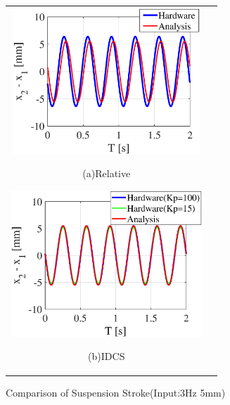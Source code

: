 \documentclass[a4paper,12pt]{article_vdlab_sotsuron}
\begin{document}
\begin{figure}[h]
  \begin{tabular}{cc}
  \begin{minipage}{0.5\hsize}
  \begin{center}
    \includegraphics[height=55mm]{figure/sim_rela_5_3.eps}
    \end{center}
    \begin{center}
    \ (a)Relative\
    \end{center}
  \end{minipage}
  \begin{minipage}{0.5\hsize}
     \begin{center}
      \includegraphics[height=55mm]{figure/sim_linear_5_3.eps}
      \end{center}
      \begin{center}
      \ (b)IDCS\
    \end{center}
  \end{minipage}
  \end{tabular}
  \vspace*{2mm}
  \caption{Comparison of Suspension Stroke(Input:3Hz 5mm)}
  \label{fig:sim_5_3}
\end{figure}
\end{document}
